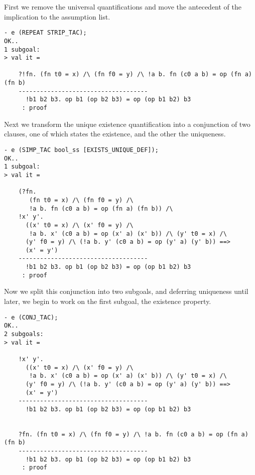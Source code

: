 First we remove the universal quantifications and move the antecedent of the
implication to the assumption list.
%
\begin{session}
\begin{verbatim}
- e (REPEAT STRIP_TAC);
OK..
1 subgoal:
> val it =
    
    ?!fn. (fn t0 = x) /\ (fn f0 = y) /\ !a b. fn (c0 a b) = op (fn a) (fn b)
    ------------------------------------
      !b1 b2 b3. op b1 (op b2 b3) = op (op b1 b2) b3
     : proof
\end{verbatim}
\end{session}

Next we transform the unique existence quantification into a conjunction of
two clauses, one of which states the existence, and the other the uniqueness.
%
\begin{session}
\begin{verbatim}
- e (SIMP_TAC bool_ss [EXISTS_UNIQUE_DEF]);
OK..
1 subgoal:
> val it =
    
    (?fn.
       (fn t0 = x) /\ (fn f0 = y) /\
       !a b. fn (c0 a b) = op (fn a) (fn b)) /\
    !x' y'.
      ((x' t0 = x) /\ (x' f0 = y) /\
       !a b. x' (c0 a b) = op (x' a) (x' b)) /\ (y' t0 = x) /\
      (y' f0 = y) /\ (!a b. y' (c0 a b) = op (y' a) (y' b)) ==>
      (x' = y')
    ------------------------------------
      !b1 b2 b3. op b1 (op b2 b3) = op (op b1 b2) b3
     : proof
\end{verbatim}
\end{session}

Now we split this conjunction into two subgoals, and
 deferring uniqueness until later,
we begin to work on
the first subgoal, the existence property.
%
\begin{session}
\begin{verbatim}
- e (CONJ_TAC);
OK..
2 subgoals:
> val it =
    
    !x' y'.
      ((x' t0 = x) /\ (x' f0 = y) /\
       !a b. x' (c0 a b) = op (x' a) (x' b)) /\ (y' t0 = x) /\
      (y' f0 = y) /\ (!a b. y' (c0 a b) = op (y' a) (y' b)) ==>
      (x' = y')
    ------------------------------------
      !b1 b2 b3. op b1 (op b2 b3) = op (op b1 b2) b3
    
    
    ?fn. (fn t0 = x) /\ (fn f0 = y) /\ !a b. fn (c0 a b) = op (fn a) (fn b)
    ------------------------------------
      !b1 b2 b3. op b1 (op b2 b3) = op (op b1 b2) b3
     : proof
\end{verbatim}
\end{session}

